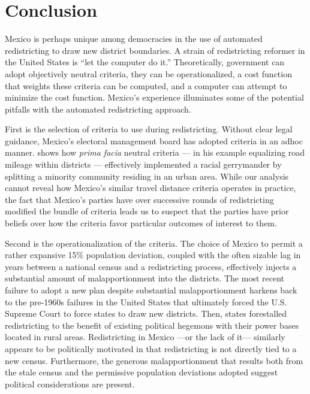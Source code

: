 \documentclass[letter,12pt]{article}
\begin{document}
\section{Conclusion}

Mexico is perhaps unique among democracies in the use of automated redistricting to draw new district boundaries. A strain of redistricting reformer in the United States is ``let the computer do it.'' Theoretically, government can adopt objectively neutral criteria, they can be operationalized, a cost function that weights these criteria can be computed, and a computer can attempt to minimize the cost function. Mexico's experience illuminates some of the potential pitfalls with the automated redistricting approach.

First is the selection of criteria to use during redistricting. Without clear legal guidance, Mexico's electoral management board has adopted criteria in an adhoc manner. \citet{parker.1990} shows how \emph{prima facia} neutral criteria --- in his example equalizing road mileage within districts --- effectively implemented a racial gerrymander by splitting a minority community residing in an urban area. While our analysis cannot reveal how Mexico's similar travel distance criteria operates in practice, the fact that Mexico's parties have over successive rounds of redistricting modified the bundle of criteria leads us to suspect that the parties have prior beliefs over how the criteria favor particular outcomes of interest to them.

Second is the operationalization of the criteria. The choice of Mexico to permit a rather expansive 15\% population deviation, coupled with the often sizable lag in years between a national census and a redistricting process, effectively injects a substantial amount of malapportionment into the districts. The most recent failure to adopt a new plan despite substantial malapportionment harkens back to the pre-1960s failures in the United States that ultimately forced the U.S. Supreme Court to force states to draw new districts. Then, states forestalled redistricting to the benefit of existing political hegemons with their power bases located in rural areas. Redistricting in Mexico ---or the lack of it--- similarly appears to be politically motivated in that redistricting is not directly tied to a new census. Furthermore, the generous malapportionment that results both from the stale census and the permissive population deviations adopted suggest political considerations are present.
\end{document}
